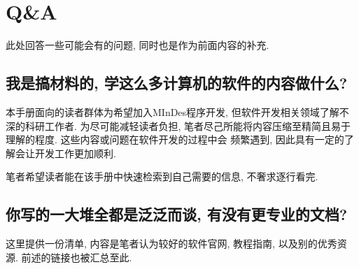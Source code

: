 \section{Q\&A}\label{QA}
此处回答一些可能会有的问题, 同时也是作为前面内容的补充.

\subsection{我是搞材料的, 学这么多计算机的软件的内容做什么?}
本手册面向的读者群体为希望加入MInDes程序开发, 但软件开发相关领域了解不深的科研工作者. 
为尽可能减轻读者负担, 笔者尽己所能将内容压缩至精简且易于理解的程度. 这些内容或问题在软件开发的过程中会
频繁遇到, 因此具有一定的了解会让开发工作更加顺利.

笔者希望读者能在该手册中快速检索到自己需要的信息, 不奢求逐行看完.

\subsection{你写的一大堆全都是泛泛而谈, 有没有更专业的文档?}
这里提供一份清单, 内容是笔者认为较好的软件官网, 教程指南, 以及别的优秀资源. 前述的链接也被汇总至此.

